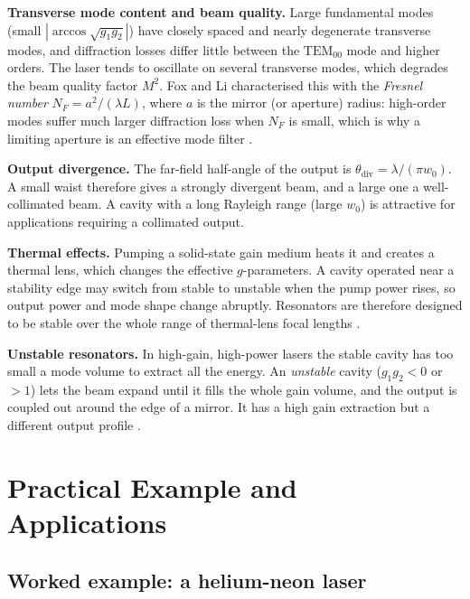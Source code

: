\documentclass[11pt,a4paper]{article}
\begin{document}
	\textbf{Transverse mode content and beam quality.} Large fundamental modes (small $|{\arccos\sqrt{g_1g_2}}|$) have closely spaced and nearly degenerate transverse modes, and diffraction losses differ little between the $\mathrm{TEM}_{00}$ mode and higher orders. The laser tends to oscillate on several transverse modes, which degrades the beam quality factor $M^2$. Fox and Li characterised this with the \emph{Fresnel number} $N_F=a^2/(\lambda L)$, where $a$ is the mirror (or aperture) radius: high-order modes suffer much larger diffraction loss when $N_F$ is small, which is why a limiting aperture is an effective mode filter \cite{FoxLi1961}.
	
	\textbf{Output divergence.} The far-field half-angle of the output is $\theta_{\mathrm{div}}=\lambda/(\pi w_0)$. A small waist therefore gives a strongly divergent beam, and a large one a well-collimated beam. A cavity with a long Rayleigh range (large $w_0$) is attractive for applications requiring a collimated output.
	
	\textbf{Thermal effects.} Pumping a solid-state gain medium heats it and creates a thermal lens, which changes the effective $g$-parameters. A cavity operated near a stability edge may switch from stable to unstable when the pump power rises, so output power and mode shape change abruptly. Resonators are therefore designed to be stable over the whole range of thermal-lens focal lengths \cite{Svelto}.
	
	\textbf{Unstable resonators.} In high-gain, high-power lasers the stable cavity has too small a mode volume to extract all the energy. An \emph{unstable} cavity ($g_1g_2<0$ or $>1$) lets the beam expand until it fills the whole gain volume, and the output is coupled out around the edge of a mirror. It has a high gain extraction but a different output profile \cite{Siegman}.
	
	\section{Practical Example and Applications}
	\label{sec:examples}
	
	\subsection{Worked example: a helium-neon laser}
	
\end{document}
